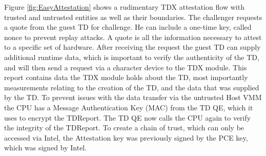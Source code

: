 Figure \ref{fig:EasyAttestation} shows a rudimentary TDX attestation flow with trusted and untrusted entities as well as their boundaries. The challenger requests a quote from the guest TD for challenge. He can include a one-time key, called nonce to prevent replay attacks. A quote is all the information necessary to attest to a specific set of hardware. After receiving the request the guest TD can supply additional runtime data, which is important to verify the authenticity of the TD, and will then send a request via a character device to the TDX module. This report contains data the TDX module holds about the TD, most importantly measurements relating to the creation of the TD, and the data that was supplied by the TD. To prevent issues with the data transfer via the untrusted Host VMM the CPU has a Message Authentication Key (MAC) from the TD QE, which it uses to encrypt the TDReport. The TD QE now calls the CPU again to verify the integrity of the TDReport.
To create a chain of trust, which can only be accessed via Intel, the Attestation key was previously signed by the PCE key, which was signed by Intel. 

